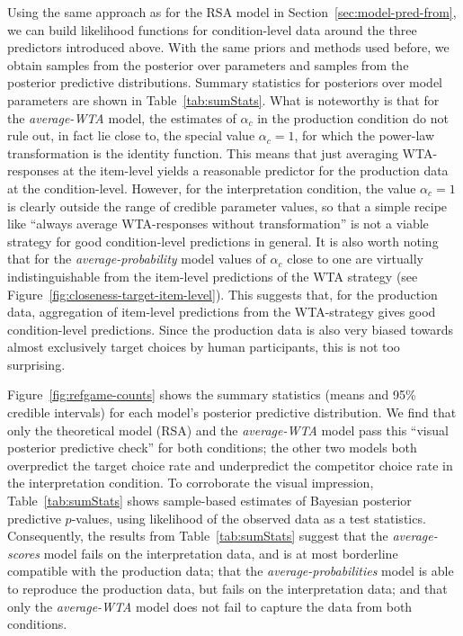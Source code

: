 \documentclass[fleqn]{article}
\begin{document}
Using the same approach as for the RSA model in Section~\ref{sec:model-pred-from}, we can build likelihood functions for condition-level data around the three predictors introduced above.
With the same priors and methods used before, we obtain samples from the posterior over parameters and samples from the posterior predictive distributions.
Summary statistics for posteriors over model parameters are shown in Table~\ref{tab:sumStats}.
What is noteworthy is that for the \emph{average-WTA} model, the estimates of $\alpha_{c}$ in the production condition do not rule out, in fact lie close to, the special value $\alpha_{c}=1$, for which the power-law transformation is the identity function.
This means that just averaging WTA-responses at the item-level yields a reasonable predictor for the production data at the condition-level.
However, for the interpretation condition, the value $\alpha_{c}=1$ is clearly outside the range of credible parameter values, so that a simple recipe like ``always average WTA-responses without transformation'' is not a viable strategy for good condition-level predictions in general.
It is also worth noting that for the \emph{average-probability} model values of $\alpha_{c}$ close to one are virtually indistinguishable from the item-level predictions of the WTA strategy (see Figure~\ref{fig:closeness-target-item-level}).
This suggests that, for the production data, aggregation of item-level predictions from the WTA-strategy gives good condition-level predictions.
Since the production data is also very biased towards almost exclusively target choices by human participants, this is not too surprising.

Figure~\ref{fig:refgame-counts} shows the summary statistics (means and 95\% credible intervals) for each model's posterior predictive distribution.
We find that only the theoretical model (RSA) and the \emph{average-WTA} model pass this ``visual posterior predictive check'' for both conditions; the other two models both overpredict the target choice rate and underpredict the competitor choice rate in the interpretation condition.
To corroborate the visual impression, Table~\ref{tab:sumStats} shows sample-based estimates of Bayesian posterior predictive $p$-values, using likelihood of the observed data as a test statistics.
Consequently, the results from Table~\ref{tab:sumStats} suggest that the \emph{average-scores} model fails on the interpretation data, and is at most borderline compatible with the production data; that the \emph{average-probabilities} model is able to reproduce the production data, but fails on the interpretation data; and that only the \emph{average-WTA} model does not fail to capture the data from both conditions.
\end{document}
